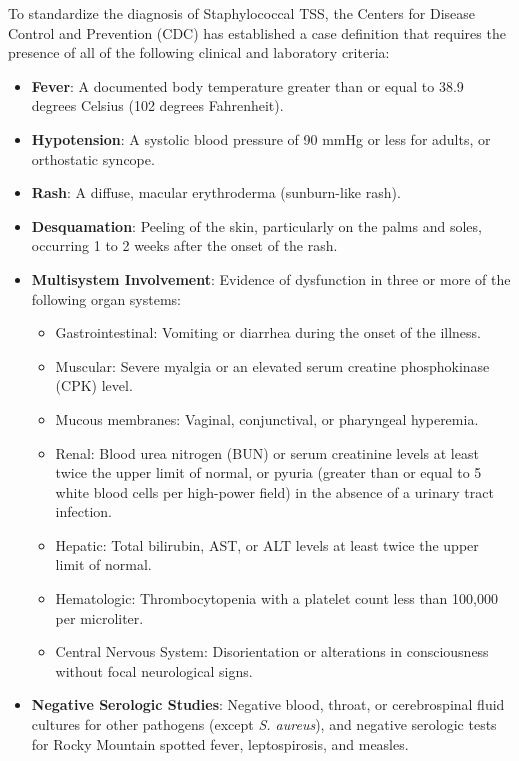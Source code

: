 To standardize the diagnosis of Staphylococcal TSS, the Centers for Disease Control and Prevention (CDC) has established a case definition that requires the presence of all of the following clinical and laboratory criteria:
\begin{itemize}
    \item \textbf{Fever}: A documented body temperature greater than or equal to 38.9 degrees Celsius (102 degrees Fahrenheit).
    \item \textbf{Hypotension}: A systolic blood pressure of 90 mmHg or less for adults, or orthostatic syncope.
    \item \textbf{Rash}: A diffuse, macular erythroderma (sunburn-like rash).
    \item \textbf{Desquamation}: Peeling of the skin, particularly on the palms and soles, occurring 1 to 2 weeks after the onset of the rash.
    \item \textbf{Multisystem Involvement}: Evidence of dysfunction in three or more of the following organ systems:
    \begin{itemize}
        \item Gastrointestinal: Vomiting or diarrhea during the onset of the illness.
        \item Muscular: Severe myalgia or an elevated serum creatine phosphokinase (CPK) level.
        \item Mucous membranes: Vaginal, conjunctival, or pharyngeal hyperemia.
        \item Renal: Blood urea nitrogen (BUN) or serum creatinine levels at least twice the upper limit of normal, or pyuria (greater than or equal to 5 white blood cells per high-power field) in the absence of a urinary tract infection.
        \item Hepatic: Total bilirubin, AST, or ALT levels at least twice the upper limit of normal.
        \item Hematologic: Thrombocytopenia with a platelet count less than 100,000 per microliter.
        \item Central Nervous System: Disorientation or alterations in consciousness without focal neurological signs.
    \end{itemize}
    \item \textbf{Negative Serologic Studies}: Negative blood, throat, or cerebrospinal fluid cultures for other pathogens (except \textit{S. aureus}), and negative serologic tests for Rocky Mountain spotted fever, leptospirosis, and measles.
\end{itemize}

